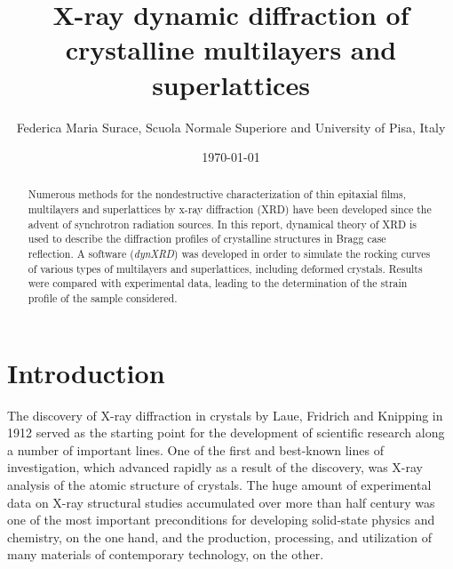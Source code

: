 \documentclass[12pt,oneside,notitlepage,abstracton,a4paper]{scrartcl}
\title{\Large X-ray dynamic diffraction of crystalline multilayers and superlattices}
\author{\normalsize Federica Maria Surace, Scuola Normale Superiore and University of Pisa, Italy}
\date{\normalsize \today}
\begin{document}
\maketitle

\begin{abstract}

\noindent

Numerous methods for the nondestructive characterization of thin epitaxial films,
multilayers and superlattices by x-ray diffraction (XRD) have been developed since the advent of synchrotron radiation sources. In this report, dynamical theory of XRD is used to describe the diffraction profiles of crystalline structures in Bragg case reflection. A software (\textit{dynXRD}) was developed in order to simulate the rocking curves of various types of multilayers and superlattices, including deformed crystals. Results were compared with experimental data, leading to the determination of the strain profile of the sample considered.
\end{abstract}



\newpage


\tableofcontents
\newpage 

\section{Introduction}
\label{intro}
The discovery of X-ray diffraction in crystals by Laue, Fridrich and Knipping in 1912 served as the starting point for the development of scientific research along a number of important lines. One of the first and best-known lines of investigation, which advanced rapidly as a result of the discovery, was X-ray analysis of the atomic structure of crystals. The huge amount of experimental data on X-ray structural studies accumulated over more than half century was one of the most important preconditions for developing solid-state physics and chemistry, on the one hand, and the production, processing, and utilization of many materials of contemporary technology, on the other.
\\
\end{document}
